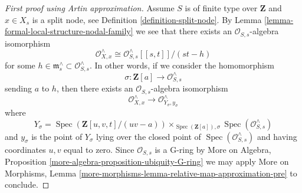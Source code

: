 \documentclass[10pt,a4paper]{amsart}
\theoremstyle{plain}
\theoremstyle{definition}
\theoremstyle{remark}
\numberwithin{equation}{subsection}
\def\Spec{\mathop{\mathrm{Spec}}}
\begin{document}
\begin{proof}[First proof using Artin approximation]
\medskip\noindent
Assume $S$ is of finite type over $\mathbf{Z}$ and
$x \in X_s$ is a split node, see Definition \ref{definition-split-node}.
By Lemma \ref{lemma-formal-local-structure-nodal-family} we see that there
exists an $\mathcal{O}_{S, s}$-algebra isomorphism
$$
\mathcal{O}_{X, x}^\wedge \cong
\mathcal{O}_{S, s}^\wedge[[s, t]]/(st - h)
$$
for some $h \in \mathfrak m_s^\wedge \subset \mathcal{O}_{S, s}^\wedge$.
In other words, if we consider the homomorphism
$$
\sigma : \mathbf{Z}[a] \longrightarrow \mathcal{O}_{S, s}^\wedge
$$
sending $a$ to $h$, then there exists an $\mathcal{O}_{S, s}$-algebra
isomorphism
$$
\mathcal{O}_{X, x}^\wedge
\longrightarrow
\mathcal{O}_{Y_\sigma, y_\sigma}^\wedge
$$
where
$$
Y_\sigma = \Spec(\mathbf{Z}[u, v, t]/(uv - a))
\times_{\Spec(\mathbf{Z}[a]), \sigma} \Spec(\mathcal{O}_{S, s}^\wedge)
$$
and $y_\sigma$ is the point of $Y_\sigma$ lying over
the closed point of $\Spec(\mathcal{O}_{S, s}^\wedge)$
and having coordinates $u, v$ equal to zero. Since
$\mathcal{O}_{S, s}$ is a G-ring by
More on Algebra, Proposition \ref{more-algebra-proposition-ubiquity-G-ring}
we may apply More on Morphisms, Lemma
\ref{more-morphisms-lemma-relative-map-approximation-pre}
to conclude.
\end{proof}
\end{document}
